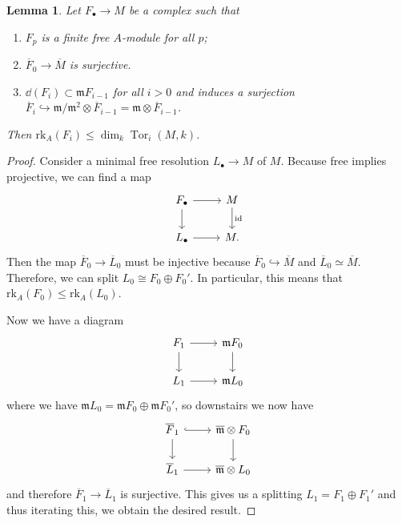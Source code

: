\documentclass[leqno, openany]{memoir}
\newtheorem{lem}[thm]{Lemma}
\theoremstyle{definition}
\theoremstyle{remark}
\theoremstyle{plain}
\theoremstyle{definition}
\theoremstyle{remark}
\newcommand{\mf}[1]{\mathfrak{#1}}
\newcommand{\mr}[1]{\mathrm{#1}}
\newcommand{\ol}[1]{\overline{#1}}
\DeclareMathOperator{\Tor}{Tor}
\begin{document}
\begin{lem}
    Let $F_{\bullet} \to M$ be a complex such that
    \begin{enumerate}
        \item $F_p$ is a finite free $A$-module for all $p$;
        \item $\ol{F}_0 \to \ol{M}$ is surjective.
        \item $\dd{(F_i)} \subset \mf{m} F_{i-1}$ for all $i > 0$ and induces a surjection $\ol{F}_i \hookrightarrow \mf{m} / \mf{m}^2 \otimes \ol{F}_{i-1} = \mf{m} \otimes \ol{F}_{i-1}$.
    \end{enumerate}
    Then $\mr{rk}_A(F_i) \leq \dim_k \Tor_i(M, k)$.
\end{lem}

\begin{proof}
    Consider a minimal free resolution $L_{\bullet} \to M$ of $M$. Because free implies projective, we can find a map
    \begin{equation*}
    \begin{tikzcd}
        F_{\bullet} \arrow{r} \arrow{d} & M \arrow{d}{\mr{id}} \\
        L_{\bullet} \arrow{r} & M.
    \end{tikzcd}
    \end{equation*}
    Then the map $\ol{F}_0 \to \ol{L}_0$ must be injective because $\ol{F}_0 \hookrightarrow \ol{M}$ and $\ol{L}_0 \simeq \ol{M}$. Therefore, we can split $L_0 \cong F_0 \oplus F_0'$. In particular, this means that $\mr{rk}_A(F_0) \leq \mr{rk}_A(L_0)$.

    Now we have a diagram
    \begin{equation*}
    \begin{tikzcd}
        F_1 \arrow{r} \arrow{d} & \mf{m} F_0 \arrow{d} \\
        L_1 \arrow{r} & \mf{m} L_0
    \end{tikzcd}
    \end{equation*}
    where we have $\mf{m}L_0 = \mf{m} F_0 \oplus \mf{m} F_0'$, so downstairs we now have
    \begin{equation*}
    \begin{tikzcd}
        \ol{F}_1 \arrow[hookrightarrow]{r} \arrow{d} & \ol{\mf{m}} \otimes F_0 \arrow{d} \\
        \ol{L}_1 \arrow{r} & \ol{\mf{m}} \otimes L_0
    \end{tikzcd}
    \end{equation*}
    and therefore $\ol{F}_1 \to \ol{L}_1$ is surjective. This gives us a splitting $L_1 = F_1 \oplus F_1'$ and thus iterating this, we obtain the desired result.
\end{proof}
\end{document}
